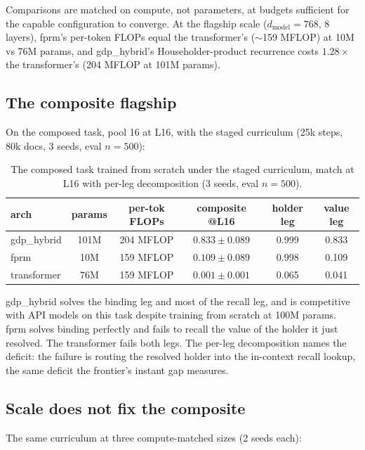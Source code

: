 \documentclass[11pt]{article}
\begin{document}
Comparisons are matched on compute, not parameters, at budgets sufficient for the capable
configuration to converge. At the flagship scale ($d_{\mathrm{model}}=768$, 8 layers), fprm's
per-token FLOPs equal the transformer's ($\sim$159 MFLOP) at 10M vs 76M params, and
gdp\_hybrid's Householder-product recurrence costs $1.28\times$ the transformer's (204 MFLOP
at 101M params).

\subsection{The composite flagship}

On the composed task, pool 16 at L16, with the staged curriculum (25k steps, 80k docs, 3
seeds, eval $n=500$):

\begin{table}[h]
\centering
\begin{tabular}{lccccc}
\toprule
arch & params & per-tok FLOPs & composite @L16 & holder leg & value leg \\
\midrule
gdp\_hybrid & 101M & 204 MFLOP & $0.833 \pm 0.089$ & 0.999 & 0.833 \\
fprm & 10M & 159 MFLOP & $0.109 \pm 0.089$ & 0.998 & 0.109 \\
transformer & 76M & 159 MFLOP & $0.001 \pm 0.001$ & 0.065 & 0.041 \\
\bottomrule
\end{tabular}
\caption{The composed task trained from scratch under the staged curriculum, match at L16 with per-leg decomposition (3 seeds, eval $n=500$).}
\label{tab:flagship}
\end{table}

gdp\_hybrid solves the binding leg and most of the recall leg, and is competitive with API
models on this task despite training from scratch at 100M params. fprm solves binding
perfectly and fails to recall the value of the holder it just resolved. The transformer fails
both legs. The per-leg decomposition names the deficit: the failure is routing the resolved holder into the in-context
recall lookup, the same deficit the frontier's instant gap measures.

\subsection{Scale does not fix the composite}

The same curriculum at three compute-matched sizes (2 seeds each):
\end{document}
